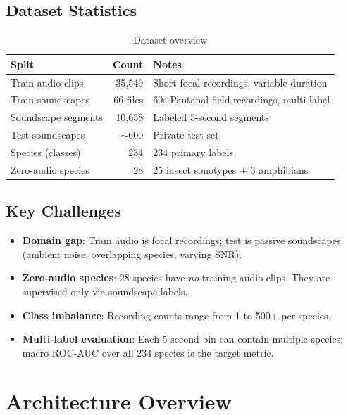 \documentclass[11pt,a4paper]{article}
\begin{document}
\subsection{Dataset Statistics}

\begin{table}[H]
\centering
\caption{Dataset overview}
\begin{tabular}{lrl}
\toprule
\textbf{Split} & \textbf{Count} & \textbf{Notes} \\
\midrule
Train audio clips & 35{,}549 & Short focal recordings, variable duration \\
Train soundscapes & 66 files & 60s Pantanal field recordings, multi-label \\
Soundscape segments & 10{,}658 & Labeled 5-second segments \\
Test soundscapes & $\sim$600 & Private test set \\
Species (classes) & 234 & 234 primary labels \\
Zero-audio species & 28 & 25 insect sonotypes + 3 amphibians \\
\bottomrule
\end{tabular}
\end{table}

\subsection{Key Challenges}

\begin{itemize}[leftmargin=1.5em]
\item \textbf{Domain gap}: Train audio is focal recordings; test is passive soundscapes
  (ambient noise, overlapping species, varying SNR).
\item \textbf{Zero-audio species}: 28 species have \emph{no} training audio clips.
  They are supervised only via soundscape labels.
\item \textbf{Class imbalance}: Recording counts range from 1 to 500+ per species.
\item \textbf{Multi-label evaluation}: Each 5-second bin can contain multiple species;
  macro ROC-AUC over all 234 species is the target metric.
\end{itemize}

\section{Architecture Overview}
\label{sec:architecture}
\end{document}
